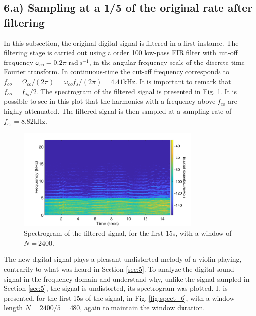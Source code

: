\documentclass[a4paper, oneside, 11pt]{article}
\begin{document}
\subsection{6.a) Sampling at a 1/5 of the original rate after filtering}\label{sec:6}

In this subsection, the original digital signal is filtered in a first instance. The filtering stage is carried out using a order 100 low-pass FIR filter with cut-off frequency $\omega_{co} = 0.2 \pi \; \mathrm{rad\:s^{-1}}$, in the angular-frequency scale of the discrete-time Fourier transform. In continuous-time the cut-off frequency corresponds to $f_{co} = \Omega_{co}/(2\pi) =  \omega_{co} f_s /(2\pi) = 4.41$kHz. It is important to remark that $f_{co} = f_{s_5}/2$. The spectrogram of the filtered signal is presented in Fig. \ref{fig:spect_6_filt}. It is possible to see in this plot that the harmonics with a frequency above $f_{co}$ are highly attenuated. The filtered signal is then sampled at a sampling rate of $f_{s_5}= 8.82$kHz.

\begin{figure}[h!]
	\centering
	\includegraphics[width=0.8\textwidth]{figures/spect_6_filt.png}
	\caption{Spectrogram of the filtered signal, for the first 15s, with a window of $N = 2400$.}
	\label{fig:spect_6_filt}
\end{figure}

The new digital signal plays a pleasant undistorted melody of a violin playing, contrarily to what was heard in Section \ref{sec:5}. To analyze the digital sound signal in the frequency domain and understand why, unlike the signal sampled in Section \ref{sec:5}, the signal is undistorted, its spectrogram was plotted. It is presented, for the first 15s of the signal, in Fig. \ref{fig:spect_6}, with a window length $N = 2400/5=480$, again to maintain the window duration.
\end{document}
